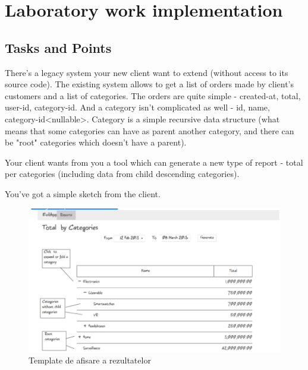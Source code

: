 \section{Laboratory work implementation}

\subsection{Tasks and Points}

There's a legacy system your new client want to extend (without access to its source code). The existing system allows to get a list of orders made by client's customers and a list of categories. The orders are quite simple - created-at, total, user-id, category-id. And a category isn't complicated as well - id, name, category-id<nullable>. Category is a simple recursive data structure (what means that some categories can have as parent another category, and there can be "root" categories which doesn't have a parent).

Your client wants from you a tool which can generate a new type of report - total per categories (including data from child descending categories).

You've got a simple sketch from the client. 
\begin{figure}[!ht]
	\centering
	\includegraphics[width=0.4\linewidth]{0}
	\caption{Template de afisare a rezultatelor}
	\label{fig:0}
\end{figure}

